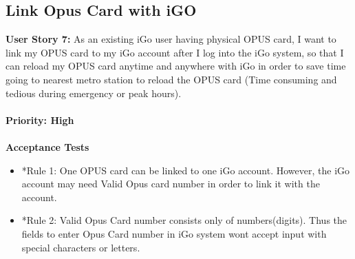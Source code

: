 \documentclass[11pt, english]{report}
\begin{document}
\subsection{Link Opus Card with iGO}
\textbf{User Story 7: }
 As an existing iGo user having physical OPUS card, I want to link my OPUS card to my iGo account after I log into the iGo system, so that I can reload my OPUS card anytime and anywhere with iGo in order to save time going to nearest metro station to reload the OPUS card (Time consuming and tedious during emergency or peak hours).
\\ \\
\textbf{Priority: High}\\ \\
\textbf{Acceptance Tests}
\begin{itemize}
    \item *Rule 1: One OPUS card can be linked to one iGo account. However, the iGo account may need Valid Opus card number in order to link it with the account.
    \item *Rule 2: Valid Opus Card number consists only of numbers(digits). Thus the fields to enter Opus Card number in iGo system wont accept input with special characters or letters.
\end{itemize}
\setlength{\tabcolsep}{18pt}
\renewcommand{\arraystretch}{1.5}
\end{document}

